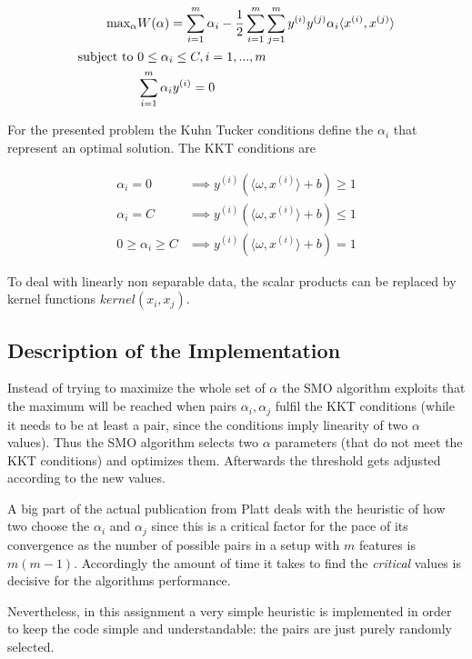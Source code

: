 \begin{align}
\text{max}_\alpha& W(\alpha) = \sum_{i=1}^m \alpha _i - \frac{1}{2} \sum_{i=1}^m \sum_{j=1}^m y^{(i)} y^{(j)} \alpha _i \langle x^{(i)}, x^{(j)} \rangle \\
\text{subject to \em} & 0\leq \alpha _i \leq C, i = 1,..., m \\
& \sum_{i=1}^m \alpha _i y^{(i)} = 0 \label{eq:sumalpha}
\end{align}

For the presented problem the Kuhn Tucker conditions define the $\alpha _i$ that represent an optimal solution. The KKT conditions are

\begin{align}
\alpha _i = 0 & \implies  y^{(i)}(\langle \omega, x^{(i)}\rangle + b)  \geq 1 \\
\alpha _i = C & \implies  y^{(i)}(\langle \omega, x^{(i)} \rangle + b)  \leq 1 \\
0 \geq \alpha _i \geq C & \implies  y^{(i)}(\langle \omega, x^{(i)} \rangle + b)  = 1 \label{eq:alphabounds}
\end{align}

To deal with linearly non separable data, the scalar products can be replaced by kernel functions $kernel(x_i, x_j)$.

\subsection{Description of the Implementation}
Instead of trying to maximize the whole set of $\alpha$ the SMO algorithm exploits that the maximum will be reached when pairs $\alpha _i, \alpha _j$ fulfil the KKT conditions (while it needs to be at least a pair, since the conditions imply linearity of two $\alpha$ values). Thus the SMO algorithm selects two $\alpha$ parameters (that do not meet the KKT conditions) and optimizes them. Afterwards the threshold gets adjusted according to the new values.

A big part of the actual publication from Platt deals with the heuristic of how two choose the $\alpha _i$ and $\alpha _j$ since this is a critical factor for the pace of its convergence as the number of possible pairs in a setup with $m$ features is $m(m-1)$. Accordingly the amount of time it takes to find the \textit{critical} values is decisive for the algorithms performance.

Nevertheless, in this assignment a very simple heuristic is implemented in order to keep the code simple and understandable: the pairs are just purely randomly selected.

